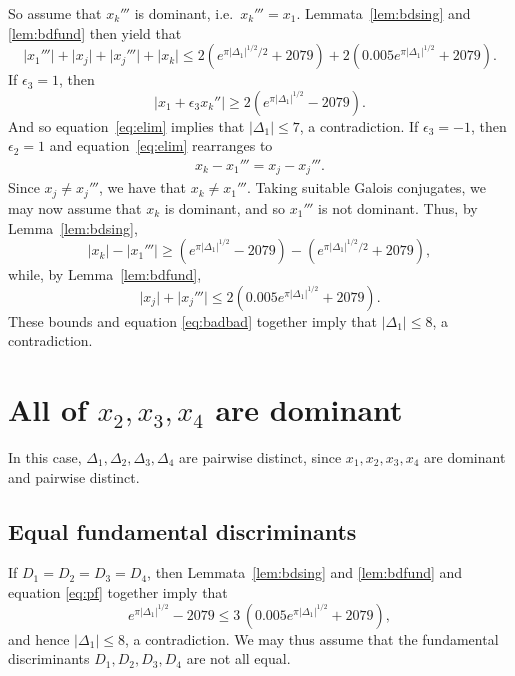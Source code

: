 \documentclass[12pt,a4paper,oneside]{amsart}
\begin{document}
So assume that $x_k'''$ is dominant, i.e.~$x_k''' = x_1$. Lemmata~\ref{lem:bdsing} and \ref{lem:bdfund} then yield that
\[ \lvert x_1''' \rvert + \lvert x_j \rvert + \lvert x_j''' \rvert + \lvert x_k \rvert \leq 2(e^{\pi \lvert \Delta_1 \rvert^{1/2}/2} + 2079) + 2 (0.005 e^{\pi \lvert \Delta_1 \rvert^{1/2}} + 2079).\]
If $\epsilon_3 = 1$, then 
\[ \lvert x_1 + \epsilon_3 x_k'' \rvert \geq 2 (e^{\pi \lvert \Delta_1 \rvert^{1/2}} - 2079).\]
And so equation~\eqref{eq:elim} implies that $\lvert \Delta_1 \rvert \leq 7$, a contradiction. If $\epsilon_3 = -1$, then $\epsilon_2 = 1$ and equation~\eqref{eq:elim} rearranges to 
\begin{align}\label{eq:badbad}
x_k - x_1''' = x_j - x_j'''.
\end{align}
Since $x_j \neq x_j'''$, we have that $x_k \neq x_1'''$. Taking suitable Galois conjugates, we may now assume that $x_k$ is dominant, and so $x_1'''$ is not dominant. Thus, by Lemma~\ref{lem:bdsing},
\[ \lvert x_k \rvert - \lvert x_1''' \rvert \geq (e^{\pi \lvert \Delta_1 \rvert^{1/2}} - 2079) - (e^{\pi \lvert \Delta_1 \rvert^{1/2}/2} + 2079),\]
while, by Lemma~\ref{lem:bdfund},
\[ \lvert x_j \rvert + \lvert x_j''' \rvert \leq 2(0.005 e^{\pi \lvert \Delta_1 \rvert^{1/2}} + 2079).\]
These bounds and equation \eqref{eq:badbad} together imply that $\lvert \Delta_1 \rvert \leq 8$, a contradiction.



	\section{All of \texorpdfstring{$x_2, x_3, x_4$}{x2, x3, x4} are dominant}\label{sec:3dom}
	
In this case, $\Delta_1, \Delta_2, \Delta_3, \Delta_4$ are pairwise distinct, since $x_1, x_2, x_3, x_4$ are dominant and pairwise distinct. 
	
	\subsection{Equal fundamental discriminants}\label{subsec:3domSameFund}
	
	If $D_1 = D_2 = D_3 = D_4$, then Lemmata~\ref{lem:bdsing} and \ref{lem:bdfund} and equation \eqref{eq:pf} together imply that
	\[ e^{\pi \lvert \Delta_1 \rvert^{1/2}} - 2079 \leq 3\,(0.005 e^{\pi \lvert \Delta_1 \rvert^{1/2}} + 2079),\]
	and hence $\lvert \Delta_1 \rvert \leq 8$, a contradiction. We may thus assume that the fundamental discriminants $D_1, D_2, D_3, D_4$ are not all equal.
	
\end{document}
